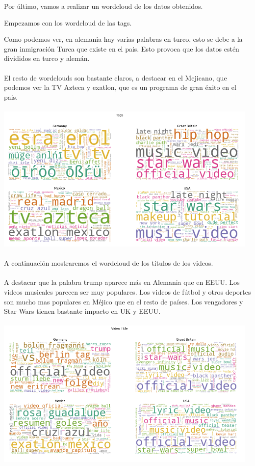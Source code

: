 \documentclass[a4paper,12pt]{article}
\begin{document}
Por \'ultimo, vamos a realizar un wordcloud de los datos obtenidos.

Empezamos con los wordcloud de las tags.

Como podemos ver,  en alemania hay varias palabras en turco, esto se debe a la gran inmigraci\'on Turca que existe en el pais. Esto provoca que los datos est\'en divididos en turco y alem\'an.
\\
\\
El resto de wordclouds son bastante claros, a destacar en el Mejicano, que podemos ver la TV Azteca y exatlon, que es un programa de gran \'exito en el pais.
\\
\\
\includegraphics[width=13cm]{wordcloud_tags.png}
\\
\\
A continuaci\'on mostraremos el wordcloud de los t\'itulos de los videos.
\\
\\
A destacar que la palabra trump aparece m\'as en Alemania que en EEUU. Los videos musicales parecen ser muy populares. Los videos de f\'utbol y otros deportes son mucho mas populares en M\'ejico que en el resto de pa\'ises. Los vengadores y Star Wars tienen bastante impacto en UK y EEUU.
\\
\\
\includegraphics[width=13cm]{wordcloud_title.png}
\end{document}
